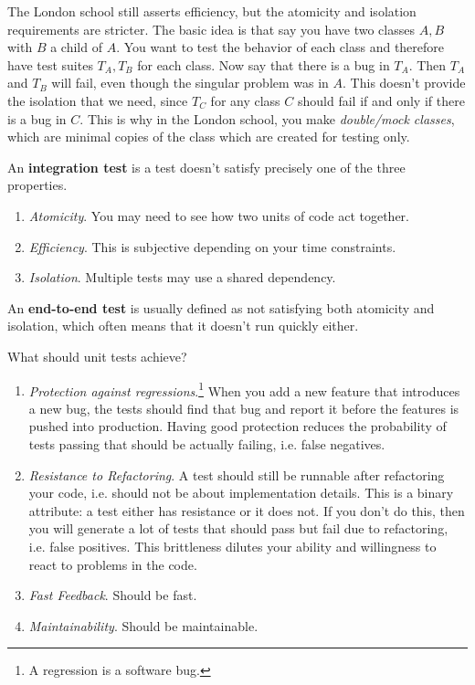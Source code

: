   The London school still asserts efficiency, but the atomicity and isolation requirements are stricter. The basic idea is that say you have two classes $A, B$ with $B$ a child of $A$. You want to test the behavior of each class and therefore have test suites $T_A, T_B$ for each class. Now say that there is a bug in $T_A$. Then $T_A$ and $T_B$ will fail, even though the singular problem was in $A$. This doesn't provide the isolation that we need, since $T_C$ for any class $C$ should fail if and only if there is a bug in $C$. This is why in the London school, you make \textit{double/mock classes}, which are minimal copies of the class which are created for testing only. 

  \begin{definition}
    An \textbf{integration test} is a test doesn't satisfy precisely one of the three properties. 
    \begin{enumerate}
      \item \textit{Atomicity}. You may need to see how two units of code act together. 
      \item \textit{Efficiency}. This is subjective depending on your time constraints. 
      \item \textit{Isolation}. Multiple tests may use a shared dependency. 
    \end{enumerate}
    An \textbf{end-to-end test} is usually defined as not satisfying both atomicity and isolation, which often means that it doesn't run quickly either.  
  \end{definition} 

  What should unit tests achieve? 
  \begin{enumerate}
    \item \textit{Protection against regressions}.\footnote{A regression is a software bug.} When you add a new feature that introduces a new bug, the tests should find that bug and report it before the features is pushed into production. Having good protection reduces the probability of tests passing that should be actually failing, i.e. false negatives. 
    \item \textit{Resistance to Refactoring}. A test should still be runnable after refactoring your code, i.e. should not be about implementation details. This is a binary attribute: a test either has resistance or it does not. If you don't do this, then you will generate a lot of tests that should pass but fail due to refactoring, i.e. false positives. This brittleness dilutes your ability and willingness to react to problems in the code. 
    \item \textit{Fast Feedback}. Should be fast. 
    \item \textit{Maintainability}. Should be maintainable. 
  \end{enumerate}

